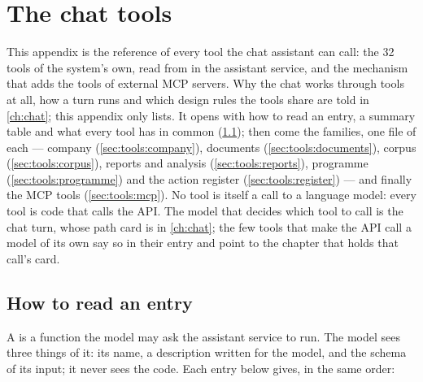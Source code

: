 \chapter{The chat tools}\label{app:tools}

This appendix is the reference of every tool the chat assistant can call: the 32 tools of the
system's own, read from  in the assistant service, and the mechanism that adds
the tools of external MCP servers. Why the chat works through tools at all, how a turn runs and
which design rules the tools share are told in \cref{ch:chat}; this appendix only lists. It
opens with how to read an entry, a summary table and what every tool has in common
(\cref{sec:tools:read}); then come the families, one file of  each ---
company (\cref{sec:tools:company}), documents (\cref{sec:tools:documents}), corpus
(\cref{sec:tools:corpus}), reports and analysis (\cref{sec:tools:reports}), programme
(\cref{sec:tools:programme}) and the action register (\cref{sec:tools:register}) --- and
finally the MCP tools (\cref{sec:tools:mcp}). No tool is itself a call to a language model:
every tool is code that calls the API. The model that decides which tool to call is the chat
turn, whose path card is in \cref{ch:chat}; the few tools that make the API call a model of its
own say so in their entry and point to the chapter that holds that call's card.


\section{How to read an entry}\label{sec:tools:read}

A  is a function the model may ask the assistant service to run. The model sees
three things of it: its name, a description written for the model, and the schema of its
input; it never sees the code. Each entry below gives, in the same order:

